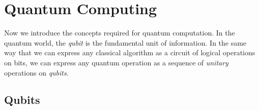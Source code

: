 
        
        





\section{Quantum Computing}
        Now we introduce the concepts required for quantum computation. In the quantum world, the \emph{qubit} is 
        the fundamental unit of information. In the same way that we can express any classical algorithm as a 
        circuit of logical operations on bits, we can express any quantum operation as a sequence of \emph{unitary} 
        operations on \emph{qubits}.
       
   \subsection{Qubits}

